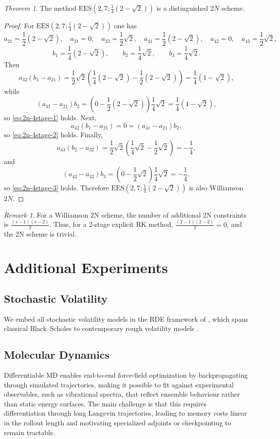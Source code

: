 \documentclass{article}
\theoremstyle{definition}
\theoremstyle{remark}
\newtheorem*{remark}{Remark}
\newtheorem{theorem}{Theorem}[section]
\begin{document}
\begin{theorem}
    The method $\mathrm{EES}(2,7;\frac{1}{4}(2-\sqrt{2}))$ is a distinguished $2N$ scheme.
\end{theorem}

\begin{proof}
    \label{thm:ees27_is_2n}
    For $\mathrm{EES}\!\left(2,7;\tfrac14(2-\sqrt2)\right)$ one has
    \[
    a_{21}=\frac12(2-\sqrt2),\quad
    a_{31}=0,\quad
    a_{32}=\frac12\sqrt2,\quad
    a_{41}=\frac12(2-\sqrt2),\quad
    a_{42}=0,\quad
    a_{43}=\frac12\sqrt2,
    \]
    \[
    b_1=\frac14(2-\sqrt2),\qquad
    b_2=\frac14\sqrt2,\qquad
    b_3=\frac14\sqrt2.
    \]
    Then
    \[
    a_{32}(b_1-a_{21})
    =
    \frac12\sqrt2\left(\frac14(2-\sqrt2)-\frac12(2-\sqrt2)\right)
    =
    \frac14(1-\sqrt2),
    \]
    while
    \[
    (a_{31}-a_{21})b_2
    =
    \left(0-\frac12(2-\sqrt2)\right)\frac14\sqrt2
    =
    \frac14(1-\sqrt2),
    \]
    so \eqref{eq:2n-4stage-1} holds. Next,
    \[
    a_{42}(b_1-a_{21})=0=(a_{41}-a_{21})b_2,
    \]
    so \eqref{eq:2n-4stage-2} holds. Finally,
    \[
    a_{43}(b_2-a_{32})
    =
    \frac12\sqrt2\left(\frac14\sqrt2-\frac12\sqrt2\right)
    =
    -\frac14,
    \]
    and
    \[
    (a_{42}-a_{32})b_3
    =
    \left(0-\frac12\sqrt2\right)\frac14\sqrt2
    =
    -\frac14,
    \]
    so \eqref{eq:2n-4stage-3} holds. Therefore
    $\mathrm{EES}\!\left(2,7;\tfrac14(2-\sqrt2)\right)$ is also Williamson $2N$.
\end{proof}

\begin{remark}
    For a Williamson 2N scheme, the number of additional 2N constraints is $\frac{(s-1)(s-2)}{2}$. Thus, for a 2-stage explicit RK method, $\frac{(2-1)(2-2)}{2} = 0$, and the 2N scheme is trivial.
\end{remark}

\section{Additional Experiments}
\subsection{Stochastic Volatility}
We embed all stochastic volatility models in the RDE framework of \citet{bonesini_rough_2024}, which spans classical Black–Scholes \cite{Black1973} to contemporary rough volatility models \cite{gatheral_volatility_2014}.

\subsection{Molecular Dynamics}
Differentiable MD enables end-to-end force-field optimization by backpropagating through simulated trajectories, making it possible to fit against experimental observables, such as vibrational spectra, that reflect ensemble behaviour rather than static energy surfaces. The main challenge is that this requires differentiation through long Langevin trajectories, leading to memory costs linear in the rollout length and motivating specialized adjoints or checkpointing to remain tractable.
\end{document}
